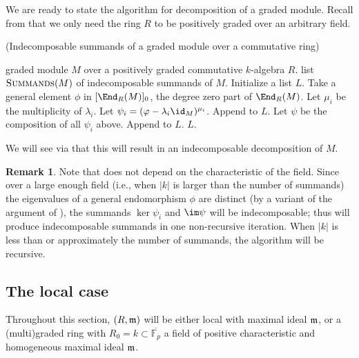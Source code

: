 \documentclass[12pt]{article}
\def\FF{\mathbb F}
\theoremstyle{theorem}
\numberwithin{thm}{section}
\theoremstyle{definition}
\newtheorem{rem}[thm]{Remark}
\begin{document}
We are ready to state the algorithm for decomposition of a graded module. Recall from  that we only need the ring $R$ to be positively graded over an arbitrary field.

\begin{algorithm}[H]
  \caption{(Indecomposable summands of a graded module over a commutative ring)}\label{alg:graded}
  \begin{algorithmic}[1]
    \smallskip
    \Require graded module $M$ over a positively graded commutative $k$-algebra $R$.
    \Ensure  list $\textproc{Summands}(M)$ of indecomposable summands of $M$.
    \State Initialize a list $L$.
    \State Take a general element $\phi$ in $[\End_R(M)]_0$,
           the degree zero part of $\End_R(M)$. \label{item:End0}
      \State Let $\mu_i$ be the multiplicity of $\lambda_i$.
      \State Let $\psi_i = (\phi - \lambda_i \id_M)^{\mu_i}$.
      \State Append  to $L$.
    \EndFor
    \State Let $\psi$ be the composition of all $\psi_i$ above.
      \State Append  to $L$.
    \EndIf
    \State \Return $L$.
  \end{algorithmic}
\end{algorithm}

We will see via  that this will result in an indecomposable decomposition of $M$.

\begin{rem}
  Note that  does not depend on the characteristic of the field. Since over a large enough field (i.e., when $|k|$ is larger than the number of summands) the eigenvalues of a general endomorphism $\phi$ are distinct (by a variant of the argument of ), the summands $\ker\psi_i$ and $\im\psi$ will be indecomposable; thus  will produce indecomposable summands in one non-recursive iteration. When $|k|$ is less than or approximately the number of summands, the algorithm will be recursive.
\end{rem}

\subsection{The local case}\label{sec:local-alg}

Throughout this section, $(R,\mathfrak m)$ will be either local with maximal ideal $\mathfrak m$, or a (multi)graded ring with $R_0 = k \subset \overline{\FF_p}$ a field of positive characteristic and homogeneous maximal ideal $\mathfrak m$.
\end{document}
